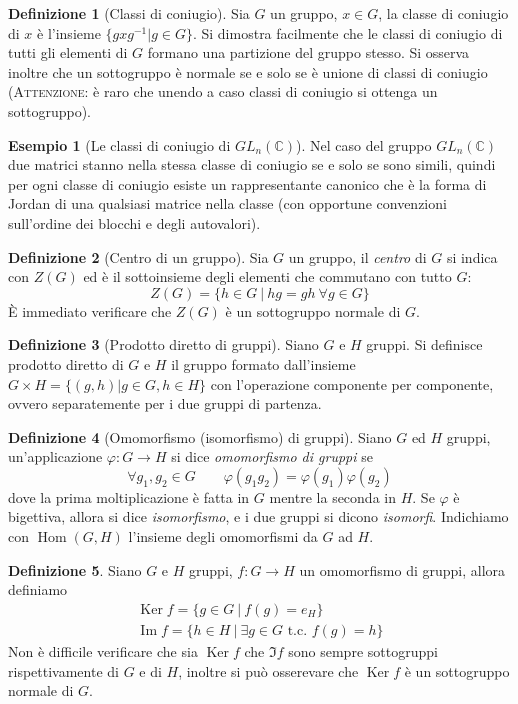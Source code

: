 \documentclass[11pt]{article}
\theoremstyle{plain}
\theoremstyle{definition}
\newtheorem{defn}{Definizione}[section]
\newtheorem{exmp}{Esempio}[section]
\theoremstyle{remark}
\newcommand{\C}{\mathbb{C}}
\DeclareMathOperator{\Hom}{Hom}
\DeclareMathOperator{\Ker}{Ker}
\DeclareMathOperator{\Imm}{Im}
\begin{document}
\begin{defn}[Classi di coniugio]
Sia $G$ un gruppo, $x \in G$, la classe di coniugio di $x$ è l'insieme $\{ gxg^{-1} | g\in G \}$. Si dimostra facilmente che le classi di coniugio di tutti gli elementi di $G$ formano una partizione del gruppo stesso. Si osserva inoltre che un sottogruppo è normale se e solo se è unione di classi di coniugio (\textsc{Attenzione:} è raro che unendo a caso classi di coniugio si ottenga un sottogruppo).
\end{defn}


\begin{exmp}[Le classi di coniugio di $GL_n(\C)$]
Nel caso del gruppo $GL_n(\C)$ due matrici stanno nella stessa classe di coniugio se e solo se sono simili, quindi per ogni classe di coniugio esiste un rappresentante canonico che è la forma di Jordan di una qualsiasi matrice nella classe (con opportune convenzioni sull'ordine dei blocchi e degli autovalori).
\end{exmp}

\begin{defn}[Centro di un gruppo]
	Sia $G$ un gruppo, il \textit{centro} di $G$ si indica con $Z(G)$ ed è il sottoinsieme degli elementi che commutano con tutto $G$:
	\[
		Z(G)=\{ h\in G\ |\ hg=gh\ \forall g\in G \}
	\]
	\`E immediato verificare che $Z(G)$ è un sottogruppo normale di $G$.

\end{defn}

\begin{defn}[Prodotto diretto di gruppi]
Siano $G$ e $H$ gruppi. Si definisce prodotto diretto di $G$ e $H$ il gruppo formato dall'insieme $G \times H = \{ (g, h) | g \in G, h \in H\}$ con l'operazione componente per componente, ovvero separatemente per i due gruppi di partenza.
\end{defn}


\begin{defn}[Omomorfismo (isomorfismo) di gruppi]
Siano $G$ ed $H$ gruppi, un'applicazione $\varphi:G\to H$ si dice \textit{omomorfismo di gruppi} se
\[
	\forall g_1,g_2\in G\qquad \varphi(g_1 g_2)=\varphi(g_1)\varphi(g_2)
\]
dove la prima moltiplicazione è fatta in $G$ mentre la seconda in $H$.
Se $\varphi$ è bigettiva, allora si dice \textit{isomorfismo}, e i due gruppi si dicono \emph{isomorfi}.
Indichiamo con $\Hom(G,H)$ l'insieme degli omomorfismi da $G$ ad $H$.
\end{defn}

\begin{defn}
	Siano $G$ e $H$ gruppi, $f:G\to H$ un omomorfismo di gruppi, allora definiamo
	\begin{gather*}
		\Ker f = \{g\in G\ |\ f(g)=e_H\}\\
		\Imm f =\{ h\in H\ |\ \exists g\in G\text{ t.c. }f(g)=h\}
	\end{gather*}
	Non è difficile verificare che sia $\Ker f$ che $\Im f$ sono sempre sottogruppi rispettivamente di $G$ e di $H$, inoltre si può osserevare che $\Ker f$ è un sottogruppo normale di $G$.
\end{defn}
\end{document}
